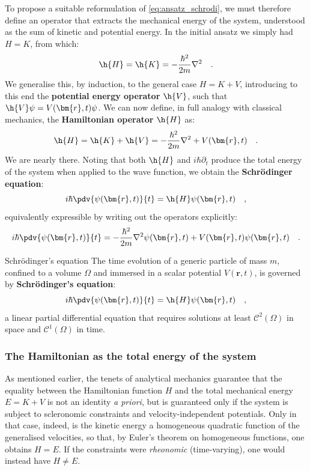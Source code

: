 To propose a suitable reformulation of \eqref{eq:ansatz_schrodi}, we must therefore define an operator that extracts the mechanical energy of the system, understood as the sum of kinetic and potential energy. In the initial ansatz we simply had $H = K$, from which:
\[
    \h{H} = \h{K} = -\frac{\hbar^2}{2m}\nabla^2 \quad.
\]
We generalise this, by induction, to the general case $H = K + V$, introducing to this end the \textbf{potential energy operator} $\h{V}$, such that $\h{V}\psi = V(\bm{r}, t)\psi$.
We can now define, in full analogy with classical mechanics, the \textbf{Hamiltonian operator} $\h{H}$ as:
\[
    \h{H} = \h{K} + \h{V} = -\frac{\hbar^2}{2m}\nabla^2 + V(\bm{r},t) \quad.
\]
We are nearly there. Noting that both $\h{H}$ and $i\hbar \partial_t$ produce the total energy of the system when applied to the wave function, we obtain the \textbf{Schrödinger equation}:
\[
    {i\hbar \pdv{\psi(\bm{r},t)}{t} = \h{H}\psi(\bm{r},t)} \quad,
\]
equivalently expressible by writing out the operators explicitly:
\[
    i\hbar \pdv{\psi(\bm{r},t)}{t} = -\frac{\hbar^2}{2m}\nabla^2\psi(\bm{r},t) + V(\bm{r},t)\psi(\bm{r},t) \quad.
\]

\begin{concettochiave}{Schrödinger's equation}
    \noindent
    The time evolution of a generic particle of mass $m$, confined to a volume $\Omega$ and immersed in a scalar potential $V(\bm{r},t)$, is governed by \textbf{Schrödinger's equation}:
    \begin{equation}
        {i\hbar \pdv{\psi(\bm{r},t)}{t} = \h{H}\psi(\bm{r},t)} \quad,
        \label{eq:schrodinger_completa}
    \end{equation}
    a linear partial differential equation that requires solutions at least $\mathcal{C}^2(\Omega)$ in space and $\mathcal{C}^1(\Omega)$ in time.
\end{concettochiave}

\subsubsection{The Hamiltonian as the total energy of the system}
As mentioned earlier, the tenets of analytical mechanics guarantee that the equality between the Hamiltonian function ${H}$ and the total mechanical energy $E = K + V$ is not an identity \emph{a priori}, but is guaranteed only if the system is subject to {scleronomic} constraints and velocity-independent potentials. Only in that case, indeed, is the kinetic energy a homogeneous quadratic function of the generalised velocities, so that, by Euler's theorem on homogeneous functions, one obtains ${H} = E$. If the constraints were \emph{rheonomic} (time-varying), one would instead have ${H} \neq E$.

